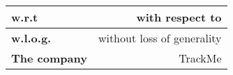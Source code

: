 \renewcommand{\arraystretch}{1.5}
\begin{center}
    \begin{tabular}{|l|r|}
        \hline
        \textbf{w.r.t} & with respect to  \\
        \hline
        \textbf{w.l.o.g.} & without loss of generality \\
        \hline
        \textbf{The company} & TrackMe \\
        \hline
    \end{tabular}
\end{center}